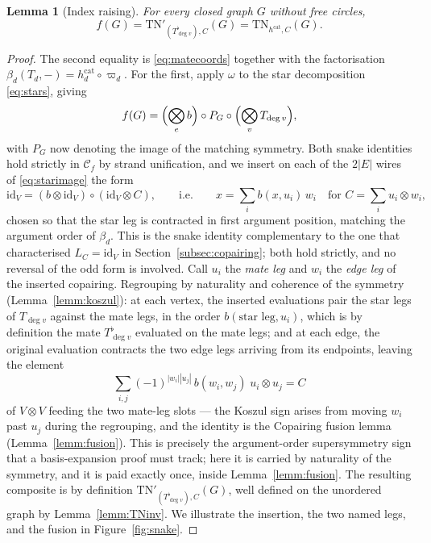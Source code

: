 \documentclass[11pt]{article}
\newtheorem{lemm}[theo]{Lemma}
\newcommand{\conncat}{\mathcal{C}_{f}}            %
\newcommand{\fib}{\omega}                         %
\newcommand{\copair}{C}                           %
\newcommand{\mate}[1]{#1^{\flat}}                 %
\newcommand{\symq}[1]{\varpi_{#1}}                %
\begin{document}
\begin{lemm}[Index raising]\label{lemm:indexraising}
For every closed graph $G$ without free circles,
\[
f(G)=\mathrm{TN}'_{(\mate{T_{\deg v}}),\copair}(G)
=\mathrm{TN}_{h^{\mathrm{cat}},\copair}(G).
\]
\end{lemm}

\begin{proof}
The second equality is \eqref{eq:matecoords} together with the
factorisation
$\beta_{d}(T_{d},-)=h^{\mathrm{cat}}_{d}\circ\symq{d}$. For
the first, apply $\fib$ to the star decomposition
\eqref{eq:stars}, giving
\begin{equation}\label{eq:starimage}
f(G)=\Bigl(\bigotimes_{e}b\Bigr)\circ P_{G}\circ
\Bigl(\bigotimes_{v}T_{\deg v}\Bigr),
\end{equation}
with $P_{G}$ now denoting the image of the matching symmetry.
Both snake identities hold strictly in $\conncat$ by strand
unification, and we insert on each of the $2|E|$ wires of
\eqref{eq:starimage} the form
\[
\mathrm{id}_{V}
=(b\otimes\mathrm{id}_{V})\circ(\mathrm{id}_{V}\otimes\copair),
\qquad\text{i.e.}\qquad
x=\sum_{i}b(x,u_{i})\,w_{i}
\quad\text{for }\copair=\sum_{i}u_{i}\otimes w_{i},
\]
chosen so that the star leg is contracted in first argument
position, matching the argument order of $\beta_{d}$. This is the
snake identity complementary to the one that characterised
$L_{\copair}=\mathrm{id}_{V}$ in
Section~\ref{subsec:copairing}; both hold strictly, and no
reversal of the odd form is involved. Call
$u_{i}$ the \emph{mate leg} and $w_{i}$ the \emph{edge leg} of the
inserted copairing. Regrouping by naturality and coherence of the
symmetry (Lemma~\ref{lemm:koszul}): at each vertex, the inserted
evaluations pair the star legs of $T_{\deg v}$ against the mate
legs, in the order $b(\text{star leg},u_{i})$, which is by
definition the mate $\mate{T_{\deg v}}$ evaluated on the mate
legs; and at each edge, the original evaluation contracts the two
edge legs arriving from its endpoints, leaving the element
\[
\sum_{i,j}(-1)^{|w_{i}||u_{j}|}\,b(w_{i},w_{j})\;
u_{i}\otimes u_{j}=\copair
\]
of $V\otimes V$ feeding the two mate-leg slots --- the Koszul
sign arises from moving $w_{i}$ past $u_{j}$ during the
regrouping, and the identity is the Copairing fusion lemma
(Lemma~\ref{lemm:fusion}). This is precisely the argument-order
supersymmetry sign that a basis-expansion proof must track; here
it is carried by naturality of the symmetry, and it is paid
exactly once, inside Lemma~\ref{lemm:fusion}. The resulting
composite is by definition
$\mathrm{TN}'_{(\mate{T_{\deg v}}),\copair}(G)$, well defined on the
unordered graph by Lemma~\ref{lemm:TNinv}. We illustrate the
insertion, the two named legs, and the fusion in
Figure~\ref{fig:snake}.
\end{proof}
\end{document}
